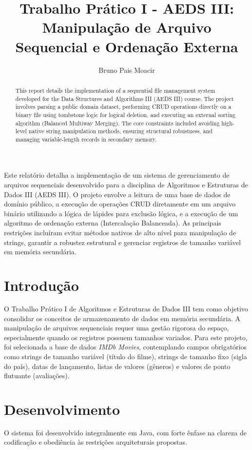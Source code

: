 \documentclass[12pt]{article}
\title{Trabalho Prático I - AEDS III:\\Manipulação de Arquivo Sequencial e Ordenação Externa}
\author{Bruno Pais Moacir}
\begin{document}
\maketitle

\begin{abstract}
This report details the implementation of a sequential file management system developed for the Data Structures and Algorithms III (AEDS III) course. The project involves parsing a public domain dataset, performing CRUD operations directly on a binary file using tombstone logic for logical deletion, and executing an external sorting algorithm (Balanced Multiway Merging). The core constraints included avoiding high-level native string manipulation methods, ensuring structural robustness, and managing variable-length records in secondary memory.
\end{abstract}

\begin{resumo}
Este relatório detalha a implementação de um sistema de gerenciamento de arquivos sequenciais desenvolvido para a disciplina de Algoritmos e Estruturas de Dados III (AEDS III). O projeto envolve a leitura de uma base de dados de domínio público, a execução de operações CRUD diretamente em um arquivo binário utilizando a lógica de lápides para exclusão lógica, e a execução de um algoritmo de ordenação externa (Intercalação Balanceada). As principais restrições incluíram evitar métodos nativos de alto nível para manipulação de strings, garantir a robustez estrutural e gerenciar registros de tamanho variável em memória secundária.
\end{resumo}

\section{Introdução}
O Trabalho Prático I de Algoritmos e Estruturas de Dados III tem como objetivo consolidar os conceitos de armazenamento de dados em memória secundária. A manipulação de arquivos sequenciais requer uma gestão rigorosa do espaço, especialmente quando os registros possuem tamanhos variados. Para este projeto, foi selecionada a base de dados \textit{IMDb Movies}, contemplando campos obrigatórios como strings de tamanho variável (título do filme), strings de tamanho fixo (sigla do país), datas de lançamento, listas de valores (gêneros) e valores de ponto flutuante (avaliações).

\section{Desenvolvimento}
O sistema foi desenvolvido integralmente em Java, com forte ênfase na clareza de codificação e obediência às restrições arquiteturais propostas.
\end{document}
